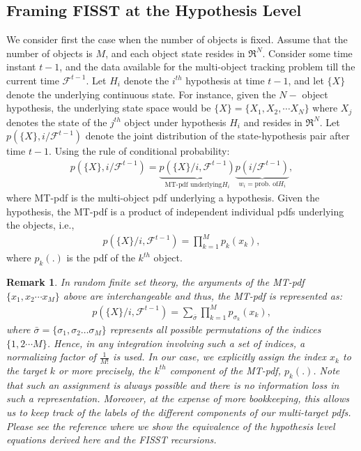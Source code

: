 \documentclass[10pt, conference]{IEEEtran}
\newtheorem{remark}{Remark}
\begin{document}
\subsection{Framing FISST at the Hypothesis Level}
We consider first the case when the number of objects is fixed. Assume that the number of objects is $M$, and each object state resides in $\Re^N$. Consider some time instant $t-1$, and the data available for the multi-object tracking problem till the current time $\mathcal{F}^{t-1}$. Let $H_i$ denote the $i^{th}$ hypothesis at time $t-1$, and let $\{X\}$ denote the underlying continuous state. For instance, given the $N-$ object hypothesis, the underlying state space would be $\{X\} = \{X_1, X_2,\cdots X_N\}$ where $X_j$ denotes the state of the $j^{th}$ object under hypothesis $H_i$ and resides in $\Re^N$. Let $p(\{X\}, i/ \mathcal{F}^{t-1})$ denote the joint distribution of the state-hypothesis pair after time $t-1$. Using the rule of conditional probability:
\begin{align}
p(\{X\}, i/ \mathcal{F}^{t-1}) = \underbrace{p(\{X\}/ i, \mathcal{F}^{t-1})}_{\mbox{MT-pdf underlying} H_i} \underbrace{p(i/ \mathcal{F}^{t-1})
}_{w_i = \mbox{prob. of} H_i},
\end{align} 
where MT-pdf is the multi-object pdf underlying a hypothesis. Given the hypothesis, the MT-pdf is a product of independent individual pdfs underlying the objects, i.e.,
\begin{align}
p(\{X\}/ i, \mathcal{F}^{t-1}) = \prod_{k=1}^M p_k(x_k),
\end{align}
where $p_k(.)$ is the pdf of the $k^{th}$ object.
\begin{remark}
In random finite set theory, the arguments of the MT-pdf $\{x_1, x_2 \cdots x_M\}$ above are interchangeable and thus, the MT-pdf is represented as:
\begin{align}
p(\{X\}/ i, \mathcal{F}^{t-1}) = \sum_{\bar{\sigma}}\prod_{k=1}^M p_{\sigma_k}(x_k),
\end{align}
where $\bar{\sigma} = \{\sigma_1, \sigma_2 \dots \sigma_M\}$ represents all possible permutations of the indices $\{1,2 \cdots M\}$. Hence, in any integration involving such a set of indices, a normalizing factor of $\frac{1}{M!}$ is used. In our case, we explicitly assign the index $x_k$ to the target $k$ or more precisely, the $k^{th}$ component of the MT-pdf, $p_k(.)$. Note that such an assignment is always possible and there is no information loss in such a representation. Moreover, at the expense of  more bookkeeping, this allows us to keep track of the labels of the different components of our multi-target pdfs. Please see the reference \cite{HFISST_journal} where we show the equivalence of the hypothesis level equations derived here and the FISST recursions.
\end{remark} 
\end{document}
